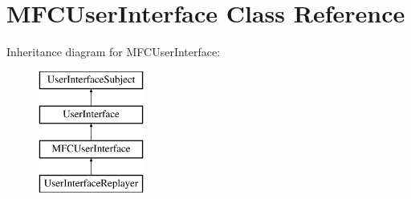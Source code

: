\hypertarget{classMFCUserInterface}{
\section{MFCUserInterface Class Reference}
\label{classMFCUserInterface}
}
Inheritance diagram for MFCUserInterface:\begin{figure}[H]
\begin{center}
\leavevmode
\includegraphics[height=4.000000cm]{classMFCUserInterface}
\end{center}
\end{figure}
